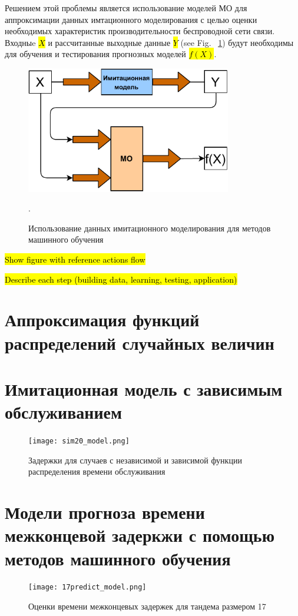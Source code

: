 Решением этой проблемы является использование моделей МО для аппроксимации данных имтационного моделирования с целью оценки необходимых характеристик производительности беспроводной сети связи. Входныe \hl{$X$} и рассчитанные выходные данные \hl{$Y$} (see Fig.~ \ref{fig:sm_ml}) будут необходимы для обучения и тестирования прогнозных моделей \hl{$f(X)$}.
  
\begin{figure}[h]\centering
    \includegraphics[width=0.8\textwidth]{images/ML(rus).pdf}
    \caption{Использование данных имитационного моделирования для методов машинного обучения}.\label{fig:sm_ml}
\end{figure}


\hl{Show figure with reference actions flow}

\hl{Describe each step (building data, learning, testing, application)}

\section{Аппроксимация функций распределений случайных величин}
\section{Имитационная модель с зависимым обслуживанием}
\begin{figure}[h!]
  \centering
  \texttt{[image: sim20\_model.png]}
  \caption{Задержки для случаев с независимой и зависимой функции распределения времени обслуживания}
  \label{fig:sim20_model}
\end{figure}

\section{Модели прогноза времени межконцевой задеркжи с помощью методов машинного обучения}
\begin{figure}[h!]
  \centering
  \texttt{[image: 17predict\_model.png]}
  \caption{Оценки времени межконцевых задержек для тандема размером 17}
  \label{fig:17predict_model}
\end{figure}

